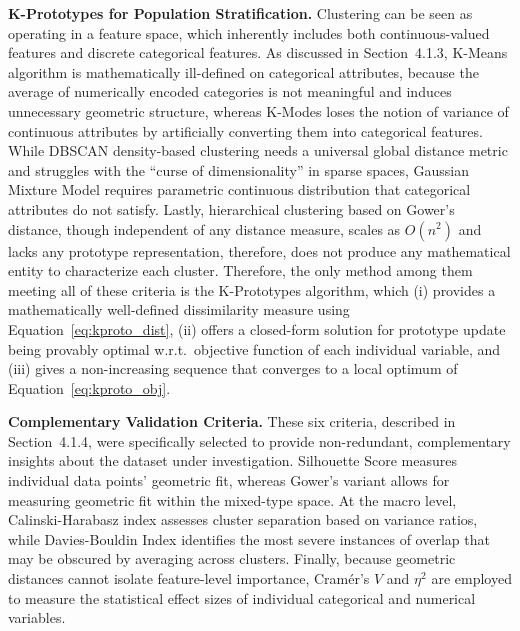 \textbf{K-Prototypes for Population Stratification.} Clustering can be seen as operating in a feature space, which inherently includes both continuous-valued features and discrete categorical features. As discussed in Section~4.1.3, K-Means algorithm is mathematically ill-defined on categorical attributes, because the average of numerically encoded categories is not meaningful and induces unnecessary geometric structure, whereas K-Modes loses the notion of variance of continuous attributes by artificially converting them into categorical features. While DBSCAN density-based clustering needs a universal global distance metric and struggles with the ``curse of dimensionality'' in sparse spaces, Gaussian Mixture Model requires parametric continuous distribution that categorical attributes do not satisfy. Lastly, hierarchical clustering based on Gower's distance, though independent of any distance measure, scales as $O(n^2)$ and lacks any prototype representation, therefore, does not produce any mathematical entity to characterize each cluster. Therefore, the only method among them meeting all of these criteria is the K-Prototypes algorithm, which (i) provides a mathematically well-defined dissimilarity measure using Equation~\eqref{eq:kproto_dist}, (ii) offers a closed-form solution for prototype update being provably optimal w.r.t.\ objective function of each individual variable, and (iii) gives a non-increasing sequence that converges to a local optimum of Equation~\eqref{eq:kproto_obj}.

\textbf{Complementary Validation Criteria.} These six criteria, described in Section~4.1.4, were specifically selected to provide non-redundant, complementary insights about the dataset under investigation. Silhouette Score measures individual data points' geometric fit, whereas Gower's variant allows for measuring geometric fit within the mixed-type space. At the macro level, Calinski-Harabasz index assesses cluster separation based on variance ratios, while Davies-Bouldin Index identifies the most severe instances of overlap that may be obscured by averaging across clusters. Finally, because geometric distances cannot isolate feature-level importance, Cramér's $V$ and $\eta^2$ are employed to measure the statistical effect sizes of individual categorical and numerical variables.

